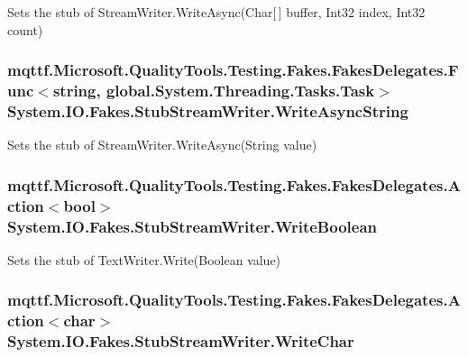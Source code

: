Sets the stub of Stream\-Writer.\-Write\-Async(\-Char\mbox{[}$\,$\mbox{]} buffer, Int32 index, Int32 count)

\hypertarget{class_system_1_1_i_o_1_1_fakes_1_1_stub_stream_writer_a96dc734adcd2a96689d80d67cc1d7189}{
\subsubsection[{Write\-Async\-String}]{\setlength{\rightskip}{0pt plus 5cm}mqttf.\-Microsoft.\-Quality\-Tools.\-Testing.\-Fakes.\-Fakes\-Delegates.\-Func$<$string, global.\-System.\-Threading.\-Tasks.\-Task$>$ System.\-I\-O.\-Fakes.\-Stub\-Stream\-Writer.\-Write\-Async\-String}}\label{class_system_1_1_i_o_1_1_fakes_1_1_stub_stream_writer_a96dc734adcd2a96689d80d67cc1d7189}


Sets the stub of Stream\-Writer.\-Write\-Async(\-String value)

\hypertarget{class_system_1_1_i_o_1_1_fakes_1_1_stub_stream_writer_aa0070db5967bf26b24edc6c308f65557}{
\subsubsection[{Write\-Boolean}]{\setlength{\rightskip}{0pt plus 5cm}mqttf.\-Microsoft.\-Quality\-Tools.\-Testing.\-Fakes.\-Fakes\-Delegates.\-Action$<$bool$>$ System.\-I\-O.\-Fakes.\-Stub\-Stream\-Writer.\-Write\-Boolean}}\label{class_system_1_1_i_o_1_1_fakes_1_1_stub_stream_writer_aa0070db5967bf26b24edc6c308f65557}


Sets the stub of Text\-Writer.\-Write(\-Boolean value)

\hypertarget{class_system_1_1_i_o_1_1_fakes_1_1_stub_stream_writer_a151471bb62da95f2fb6e15db5a4c8ae4}{
\subsubsection[{Write\-Char}]{\setlength{\rightskip}{0pt plus 5cm}mqttf.\-Microsoft.\-Quality\-Tools.\-Testing.\-Fakes.\-Fakes\-Delegates.\-Action$<$char$>$ System.\-I\-O.\-Fakes.\-Stub\-Stream\-Writer.\-Write\-Char}}\label{class_system_1_1_i_o_1_1_fakes_1_1_stub_stream_writer_a151471bb62da95f2fb6e15db5a4c8ae4}


